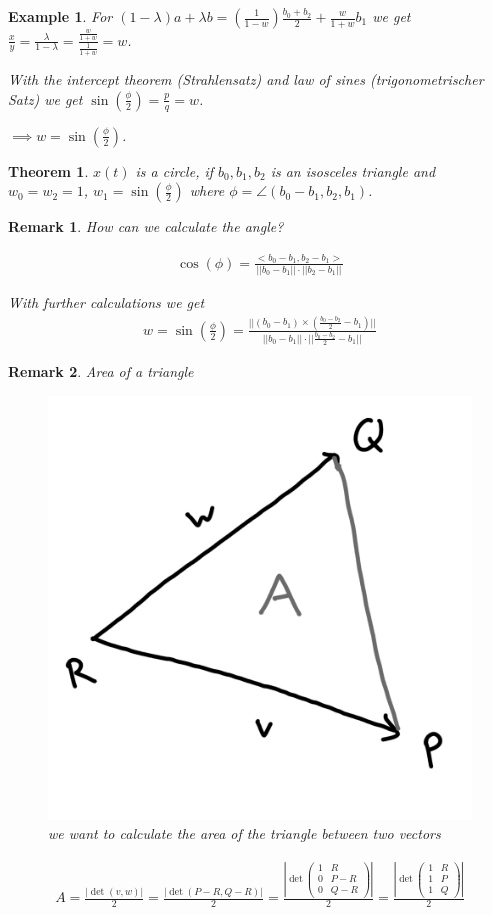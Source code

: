 \documentclass[]{article}
\newtheorem{theorem}{Theorem}
\newtheorem{example}{Example}
\newtheorem{remark}{Remark}
\begin{document}
\begin{example}
	For $(1-\lambda)a + \lambda b = (\frac{1}{1-w})\frac{b_0+b_2}{2} + \frac{w}{1+w}b_1$ we get $\frac{x}{y} = \frac{\lambda}{1-\lambda} = \frac{\frac{w}{1+w}}{\frac{1}{1+w}} = w$.
	
	With the intercept theorem (Strahlensatz) and law of sines (trigonometrischer Satz) we get $\sin(\frac{\phi}{2}) = \frac{p}{q} = w$.
	
	$\implies w = \sin(\frac{\phi}{2})$.
\end{example}

\begin{theorem}
	$x(t)$ is a circle, if $b_0, b_1, b_2$ is an isosceles triangle and $w_0=w_2=1$, $w_1 = \sin(\frac{\phi}{2})$ where $\phi = \angle (b_0-b_1, b_2, b_1)$.
\end{theorem}

\begin{remark}
	How can we calculate the angle?
	
	\begin{align*}
		\cos(\phi) = \frac{<b_0-b_1, b_2-b_1>}{||b_0-b_1||\cdot ||b_2-b_1||}
	\end{align*}
	
	With further calculations we get
	\begin{align*}
		w = \sin(\frac{\phi}{2}) = \frac{||(b_0-b_1)\times (\frac{b_0 - b_2}{2} - b_1)||}{||b_0 - b_1|| \cdot ||\frac{b_0 - b_2}{2} - b_1||}
	\end{align*}
\end{remark}

\begin{remark}
	Area of a triangle
	
	\begin{figure}[h!]
		\centering
		\includegraphics[width=0.3\linewidth]{figures/area_triangle}
		\caption{we want to calculate the area of the triangle between two vectors}
		\label{fig:area_triangle}
	\end{figure}
	
	\begin{align*}
		A = \frac{|\det(v,w)|}{2} = \frac{|\det (P-R, Q-R)|}{2} = \frac{\left|\det\left(\begin{matrix} 1 & R\\ 0 & P-R\\ 0 & Q-R \end{matrix}\right)\right|}{2} = \frac{\left|\det\left(\begin{matrix} 1 & R\\ 1 & P\\ 1 & Q \end{matrix}\right)\right|}{2}
	\end{align*}
\end{remark}
\end{document}
